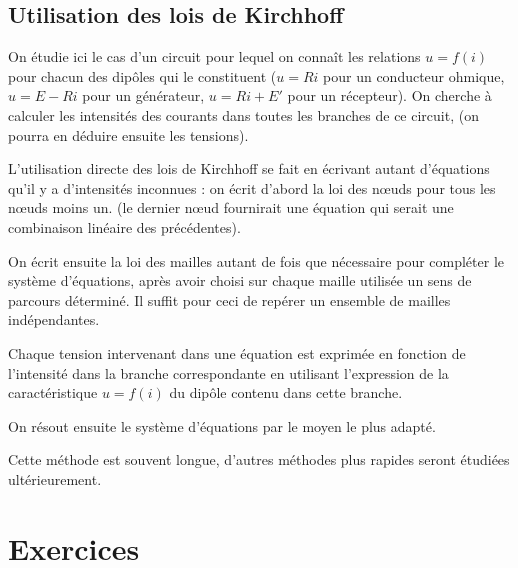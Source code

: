 \subsection{Utilisation des lois de Kirchhoff}%
\label{chap9-subsec:utilisationdeslois}%

On étudie ici le cas d'un circuit pour lequel on connaît les relations \(u = 
f(i)\) pour chacun des dipôles qui le constituent (\(u = R i\) pour un 
conducteur ohmique, \(u = E - R i\) pour un générateur, \(u = R i + E'\) pour 
un récepteur). On cherche à calculer les intensités des courants dans toutes 
les branches de ce circuit, (on pourra en déduire ensuite les tensions).

L'utilisation directe des lois de Kirchhoff se fait en écrivant autant 
d'équations qu'il y a d'intensités inconnues : on écrit d'abord la loi des 
nœuds pour tous les nœuds moins un. (le dernier nœud fournirait une équation 
qui serait une combinaison linéaire des précédentes).

On écrit ensuite la loi des mailles autant de fois que nécessaire pour 
compléter le système d'équations, après avoir choisi sur chaque maille utilisée 
un sens de parcours déterminé. Il suffit pour ceci de repérer un ensemble de 
mailles indépendantes.

Chaque tension intervenant dans une équation est exprimée en fonction de 
l'intensité dans la branche correspondante en utilisant l'expression de la 
caractéristique \(u = f(i)\) du dipôle contenu dans cette branche.

On résout ensuite le système d'équations par le moyen le plus adapté.

Cette méthode est souvent longue, d'autres méthodes plus rapides seront 
étudiées ultérieurement.

\section{Exercices}%
\label{chap9-sec:exercices}%

